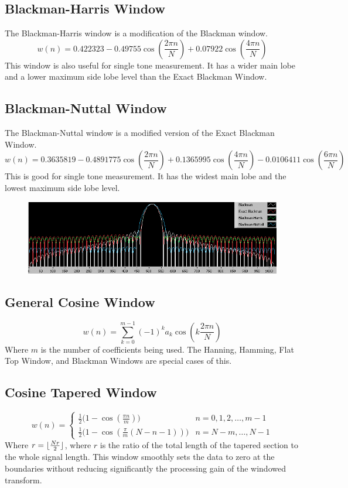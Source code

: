 \documentclass[oneside]{book}
\theoremstyle{mystyle}
\DeclarePairedDelimiter\floor{\lfloor}{\rfloor}
\begin{document}
\subsection{Blackman-Harris Window}
\noindent The Blackman-Harris window is a modification of the Blackman window.
\begin{equation}
w(n) = 0.422323 - 0.49755\cos(\frac{2\pi n}{N}) + 0.07922\cos(\frac{4\pi n}{N})
\end{equation}
\noindent This window is also useful for single tone measurement. It has a wider main lobe and a lower maximum side lobe level than the Exact Blackman Window.
\subsection{Blackman-Nuttal Window}
\noindent The Blackman-Nuttal window is a modified version of the Exact Blackman Window. 
\begin{equation}
w(n) = 0.3635819 - 0.4891775\cos(\frac{2\pi n}{N}) + 0.1365995\cos(\frac{4\pi n}{N}) - 0.0106411\cos(\frac{6\pi n}{N})
\end{equation}
\noindent This is good for single tone measurement. It has the widest main lobe and the lowest maximum side lobe level.
\begin{figure}[htbp]
  \centering
{\includegraphics[scale=0.65]{CDSW_2}}
\end{figure}
\subsection{General Cosine Window}
\begin{equation}
w(n) = \sum_{k=0}^{m-1} (-1)^{k}a_{k}\cos(k\frac{2\pi n}{N})
\end{equation}
\noindent Where $m$ is the number of coefficients being used. The Hanning, Hamming, Flat Top Window, and Blackman Windows are special cases of this.
\subsection{Cosine Tapered Window}
\begin{equation}
w(n) = \begin{cases} \frac{1}{2}\big(1-\cos(\frac{\pi n}{m})\big) & n=0,1,2,\hdots, m-1\\ \frac{1}{2}\big(1-\cos(\frac{\pi}{m}(N-n-1))\big) & n = N-m, \hdots, N-1
\end{cases}
\end{equation}
\noindent Where $r = \floor{\frac{Nr}{2}}$, where $r$ is the ratio of the total length of the tapered section to the whole signal length. This window smoothly sets the data to zero at the boundaries without reducing significantly the processing gain of the windowed transform.
\end{document}
